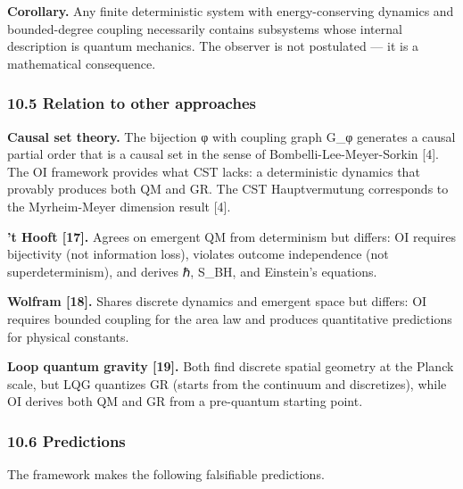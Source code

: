 \documentclass[
  11pt,
]{article}
\begin{document}
\textbf{Corollary.} Any finite deterministic system with
energy-conserving dynamics and bounded-degree coupling necessarily
contains subsystems whose internal description is quantum mechanics. The
observer is not postulated --- it is a mathematical consequence.

\hypertarget{relation-to-other-approaches}{%
\subsubsection{10.5 Relation to other
approaches}\label{relation-to-other-approaches}}

\textbf{Causal set theory.} The bijection φ with coupling graph G\_φ
generates a causal partial order that is a causal set in the sense of
Bombelli-Lee-Meyer-Sorkin {[}4{]}. The OI framework provides what CST
lacks: a deterministic dynamics that provably produces both QM and GR.
The CST Hauptvermutung corresponds to the Myrheim-Meyer dimension result
{[}4{]}.

\textbf{'t Hooft {[}17{]}.} Agrees on emergent QM from determinism but
differs: OI requires bijectivity (not information loss), violates
outcome independence (not superdeterminism), and derives ℏ, S\_BH, and
Einstein's equations.

\textbf{Wolfram {[}18{]}.} Shares discrete dynamics and emergent space
but differs: OI requires bounded coupling for the area law and produces
quantitative predictions for physical constants.

\textbf{Loop quantum gravity {[}19{]}.} Both find discrete spatial
geometry at the Planck scale, but LQG quantizes GR (starts from the
continuum and discretizes), while OI derives both QM and GR from a
pre-quantum starting point.

\hypertarget{predictions}{%
\subsubsection{10.6 Predictions}\label{predictions}}

The framework makes the following falsifiable predictions.
\end{document}
